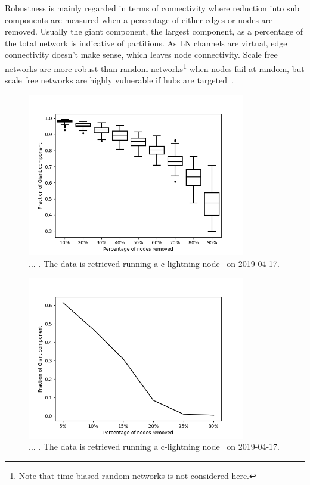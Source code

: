 Robustness is mainly regarded in terms of connectivity where reduction into sub components are measured when a percentage of either edges or nodes are removed. Usually the giant component, the largest component, as a percentage of the total network is indicative of partitions. As LN channels are virtual, edge connectivity doesn't make sense, which leaves node connectivity. Scale free networks are more robust than random networks\footnote{Note that time biased random networks is not considered here.} when nodes fail at random, but scale free networks are highly vulnerable if hubs are targeted~\cite{barabasi:robustness}. 
\vspace*{-0.5cm}
\begin{figure}[!htb]
	\hspace*{-1cm} 
	\centering
	\includegraphics[width=9.5cm]{images/robustness_accidental.png}
	\caption{... . The data is retrieved running a c-lightning node~\cite{repository:clightning} on 2019-04-17.
	}
	\label{fig:accidental_failure}
	\hspace*{2mm} 
\end{figure}
\vspace*{-1.1cm}
\begin{figure}[!htb]
	\hspace*{-1cm} 
	\centering
	\includegraphics[width=9.5cm]{images/robustness_coordinated_mait.png}
	\caption{... . The data is retrieved running a c-lightning node~\cite{repository:clightning} on 2019-04-17.
	}
	\label{fig:accidental_failure}
	\hspace*{2mm} 
\end{figure}

